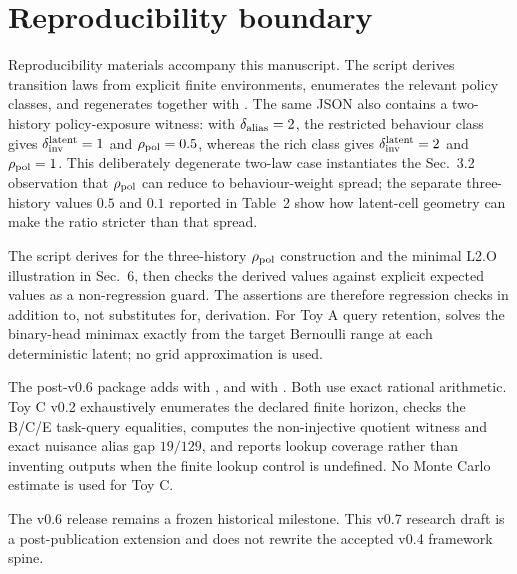 \documentclass[10pt]{article}
\begin{document}
\section{Reproducibility boundary}

Reproducibility materials accompany this manuscript. The script  derives transition laws from explicit finite environments, enumerates the relevant policy classes, and regenerates  together with . The same JSON also contains a two-history policy-exposure witness: with $\delta_{\rm alias}=2$, the restricted behaviour class gives $\delta_{\rm inv}^{\rm latent}=1$ and $\rho_{\rm pol}=0.5$, whereas the rich class gives $\delta_{\rm inv}^{\rm latent}=2$ and $\rho_{\rm pol}=1$. This deliberately degenerate two-law case instantiates the Sec.~3.2 observation that $\rho_{\rm pol}$ can reduce to behaviour-weight spread; the separate three-history values $0.5$ and $0.1$ reported in Table~2 show how latent-cell geometry can make the ratio stricter than that spread.

The script  derives  for the three-history $\rho_{\rm pol}$ construction and the minimal L2.O illustration in Sec.~6, then checks the derived values against explicit expected values as a non-regression guard. The assertions are therefore regression checks in addition to, not substitutes for, derivation. For Toy A query retention,  solves the binary-head minimax exactly from the target Bernoulli range at each deterministic latent; no grid approximation is used.

The post-v0.6 package adds  with , and  with . Both use exact rational arithmetic. Toy C v0.2 exhaustively enumerates the declared finite horizon, checks the B/C/E task-query equalities, computes the non-injective quotient witness and exact nuisance alias gap $19/129$, and reports lookup coverage rather than inventing outputs when the finite lookup control is undefined. No Monte Carlo estimate is used for Toy C.

The v0.6 release remains a frozen historical milestone. This v0.7 research draft is a post-publication extension and does not rewrite the accepted v0.4 framework spine.
\end{document}
